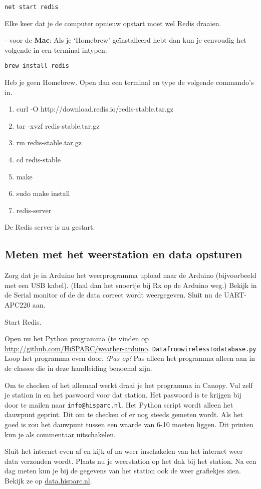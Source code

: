 \begin{verbatim}
net start redis
\end{verbatim}

Elke keer dat je de computer opnieuw opstart moet wel Redis draaien.

- voor de \textbf{Mac}:
Als je `Homebrew' geïnstalleerd hebt dan kun je eenvoudig het volgende 
in een terminal intypen: 
\begin{verbatim}
brew install redis
\end{verbatim}

Heb je geen Homebrew. Open dan een terminal en type de volgende commando's in. 

\begin{enumerate}
    \item curl -O http://download.redis.io/redis-stable.tar.gz
    \item tar -xvzf redis-stable.tar.gz 
    \item rm redis-stable.tar.gz 
    \item cd redis-stable 
    \item make 
    \item sudo make install
    \item redis-server
 \end{enumerate}
 
 De Redis server is nu gestart. 

\subsection{Meten met het weerstation en data opsturen}

Zorg dat je in Arduino het weerprogramma upload naar de Arduino
(bijvoorbeeld met een USB kabel). (Haal dan het snoertje bij Rx op de
Arduino weg.) Bekijk in de Serial monitor of de de data correct wordt
weergegeven. Sluit nu de UART-APC220 aan.  

Start Redis.

Open nu het Python programma (te vinden op
\url{http://github.com/HiSPARC/weather-arduino}. \verb|Datafromwirelesstodatabase.py|
Loop het programma even
door. \emph{!Pas op!} Pas alleen het programma alleen aan in de classes die in deze
handleiding benoemd zijn.

Om te checken of het allemaal werkt draai je het programma in Canopy. Vul zelf 
je \hisparc station in en het paswoord voor dat station. Het paswoord is te krijgen
bij \hisparc door te mailen naar \verb|info@hisparc.nl|. 
Het Python script wordt alleen het dauwpunt geprint. Dit om te checken
of er nog steeds gemeten wordt. Als het goed is zou het dauwpunt tussen 
een waarde van 6-10 moeten liggen. Dit printen kun je als commentaar uitschakelen.

Sluit het internet even af en kijk of na weer inschakelen van het internet weer
data verzonden wordt.
Plaats nu je weerstation op het dak bij het station. Na een dag meten kun je 
bij de gegevens van het station ook de weer grafiekjes zien. Bekijk ze op
\url{data.hisparc.nl}.




